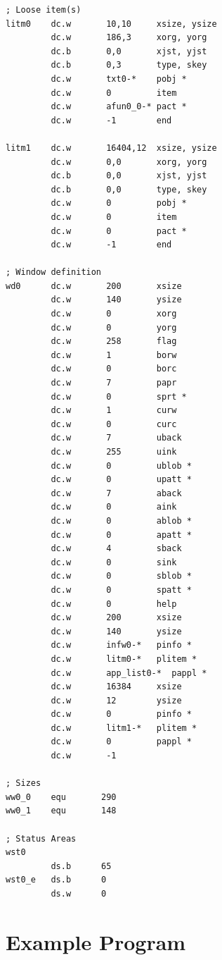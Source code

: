 \begin{lstlisting}[firstnumber=1,caption={Test Window - ApplTestWin\_asm}]
; Loose item(s)
litm0    dc.w       10,10     xsize, ysize
         dc.w       186,3     xorg, yorg
         dc.b       0,0       xjst, yjst
         dc.b       0,3       type, skey
         dc.w       txt0-*    pobj *
         dc.w       0         item
         dc.w       afun0_0-* pact *
         dc.w       -1        end

litm1    dc.w       16404,12  xsize, ysize
         dc.w       0,0       xorg, yorg
         dc.b       0,0       xjst, yjst
         dc.b       0,0       type, skey
         dc.w       0         pobj *
         dc.w       0         item
         dc.w       0         pact *
         dc.w       -1        end

; Window definition
wd0      dc.w       200       xsize
         dc.w       140       ysize
         dc.w       0         xorg
         dc.w       0         yorg
         dc.w       258       flag
         dc.w       1         borw
         dc.w       0         borc
         dc.w       7         papr
         dc.w       0         sprt *
         dc.w       1         curw
         dc.w       0         curc
         dc.w       7         uback
         dc.w       255       uink
         dc.w       0         ublob *
         dc.w       0         upatt *
         dc.w       7         aback
         dc.w       0         aink
         dc.w       0         ablob *
         dc.w       0         apatt *
         dc.w       4         sback
         dc.w       0         sink
         dc.w       0         sblob *
         dc.w       0         spatt *
         dc.w       0         help
         dc.w       200       xsize
         dc.w       140       ysize
         dc.w       infw0-*   pinfo *
         dc.w       litm0-*   plitem *
         dc.w       app_list0-*  pappl *
         dc.w       16384     xsize
         dc.w       12        ysize
         dc.w       0         pinfo *
         dc.w       litm1-*   plitem *
         dc.w       0         pappl *
         dc.w       -1

; Sizes
ww0_0    equ       290
ww0_1    equ       148

; Status Areas
wst0
         ds.b      65
wst0_e   ds.b      0
         ds.w      0
\end{lstlisting}

\section{Example Program}
\label{ch27-example-program}%


